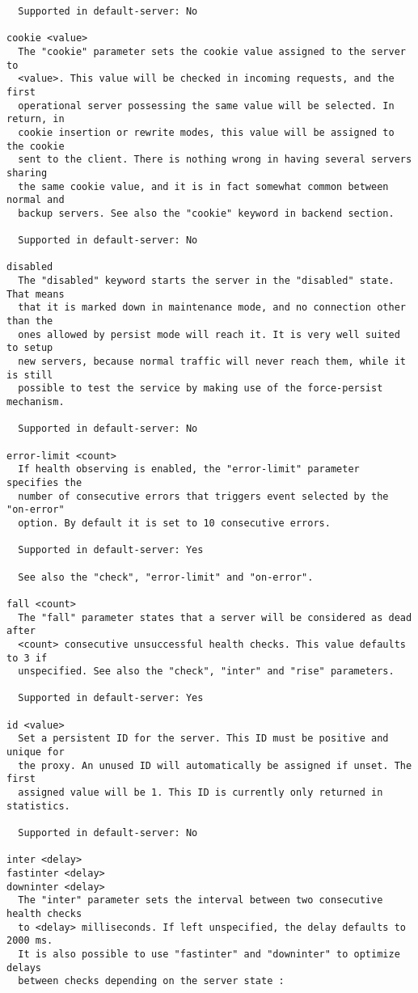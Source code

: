 \begin{verbatim}
  Supported in default-server: No

cookie <value>
  The "cookie" parameter sets the cookie value assigned to the server to
  <value>. This value will be checked in incoming requests, and the first
  operational server possessing the same value will be selected. In return, in
  cookie insertion or rewrite modes, this value will be assigned to the cookie
  sent to the client. There is nothing wrong in having several servers sharing
  the same cookie value, and it is in fact somewhat common between normal and
  backup servers. See also the "cookie" keyword in backend section.

  Supported in default-server: No

disabled
  The "disabled" keyword starts the server in the "disabled" state. That means
  that it is marked down in maintenance mode, and no connection other than the
  ones allowed by persist mode will reach it. It is very well suited to setup
  new servers, because normal traffic will never reach them, while it is still
  possible to test the service by making use of the force-persist mechanism.

  Supported in default-server: No

error-limit <count>
  If health observing is enabled, the "error-limit" parameter specifies the
  number of consecutive errors that triggers event selected by the "on-error"
  option. By default it is set to 10 consecutive errors.

  Supported in default-server: Yes

  See also the "check", "error-limit" and "on-error".

fall <count>
  The "fall" parameter states that a server will be considered as dead after
  <count> consecutive unsuccessful health checks. This value defaults to 3 if
  unspecified. See also the "check", "inter" and "rise" parameters.

  Supported in default-server: Yes

id <value>
  Set a persistent ID for the server. This ID must be positive and unique for
  the proxy. An unused ID will automatically be assigned if unset. The first
  assigned value will be 1. This ID is currently only returned in statistics.

  Supported in default-server: No

inter <delay>
fastinter <delay>
downinter <delay>
  The "inter" parameter sets the interval between two consecutive health checks
  to <delay> milliseconds. If left unspecified, the delay defaults to 2000 ms.
  It is also possible to use "fastinter" and "downinter" to optimize delays
  between checks depending on the server state :


\end{verbatim}
